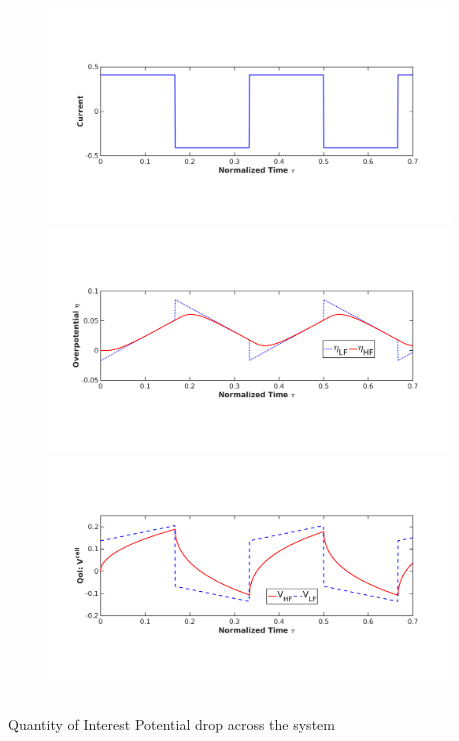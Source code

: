 \documentclass[8pt]{beamer}
\begin{document}
\begin{frame}
\begin{columns}
\begin{column}{.5\textwidth}
\begin{center}
\begin{figure}[h]
    \centering
    \includegraphics[trim = 1.2in 2.4in 1.6in 2.8in, clip, width=0.95\textwidth]{figs_report/I.png}
    \\
    \includegraphics[trim = 1.2in 2.4in 1.6in 2.8in, clip, width=0.95\textwidth]{figs_report/etaLF_HF.png}   
    \\
    \includegraphics[trim = 1.2in 2.4in 1.6in 2.8in, clip, width=0.95\textwidth]{figs_report/Vcell_HF_LF.png} 
\end{figure}
\end{center}
\end{column}
\end{columns}
\vspace{-0.05in}
\begin{columns}
\begin{column}{.65\textwidth}
\begin{alertblock}{Quantity of Interest}
 Potential drop across the system
 

\end{alertblock}
\end{column}
\end{columns}
\end{frame}
\end{document}

